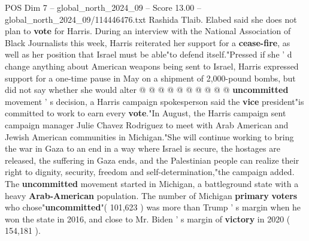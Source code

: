 \begin{textsample}{POS Dim 7 – global\_north\_2024\_09 – Score 13.00 – global\_north\_2024\_09/114446476.txt}
Rashida Tlaib.
Elabed said she does not plan to \textbf{vote} for Harris.
During an interview with the National Association of Black Journalists this week, Harris reiterated her support for a \textbf{cease-fire}, as well as her position that Israel must be able"to defend itself."Pressed if she ' d change anything about American weapons being sent to Israel, Harris expressed support for a one-time pause in May on a shipment of 2,000-pound bombs, but did not say whether she would alter @ @ @ @ @ @ @ @ @ @ \textbf{uncommitted} movement ' s decision, a Harris campaign spokesperson said the \textbf{vice} president"is committed to work to earn every \textbf{vote}."In August, the Harris campaign sent campaign manager Julie Chavez Rodriguez to meet with Arab American and Jewish American communities in Michigan."She will continue working to bring the war in Gaza to an end in a way where Israel is secure, the hostages are released, the suffering in Gaza ends, and the Palestinian people can realize their right to dignity, security, freedom and self-determination,"the campaign added.
The \textbf{uncommitted} movement started in Michigan, a battleground state with a heavy \textbf{Arab-American} population.
The number of Michigan \textbf{primary} \textbf{voters} who chose"\textbf{uncommitted}"( 101,623 ) was more than Trump ' s margin when he won the state in 2016, and close to Mr.
Biden ' s margin of \textbf{victory} in 2020 ( 154,181 ).

\end{textsample}
